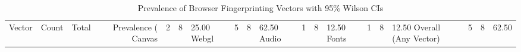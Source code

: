 \begin{table}[htbp]
\centering
\caption{Prevalence of Browser Fingerprinting Vectors with 95\% Wilson CIs}
\label{tab:prevalence_summary}
\begin{tabular}{lrrrrr}
\hline
Vector & Count & Total & Prevalence (%
\hline
Canvas & 2 & 8 & 25.00%
Webgl & 5 & 8 & 62.50%
Audio & 1 & 8 & 12.50%
Fonts & 1 & 8 & 12.50%
Overall (Any Vector) & 5 & 8 & 62.50%
\hline
\end{tabular}
\end{table}
